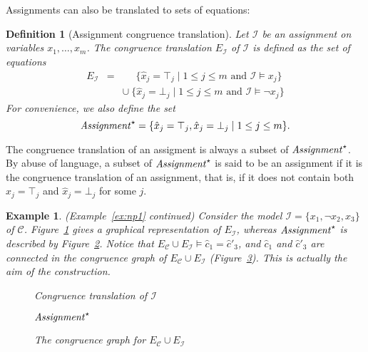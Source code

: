 \documentclass{easychair}
\newtheorem{example}{Example}
\newtheorem{definition}{Definition}
\begin{document}
Assignments can also be translated to sets of equations:
\begin{definition}[Assignment congruence translation]
Let $\mathcal{I}$ be an assignment on variables $x_1,\ldots,x_m$.
The congruence translation $E_{\mathcal{I}}$ of $\mathcal{I}$ is defined as the set of equations
\begin{eqnarray*}
  E_{\mathcal{I}} & = & \phantom{\cup}\ \{ \hat{x}_j = \top_j \mid 1 \leq j \leq m \text{ and } \mathcal{I} \models x_j \} \\
               &   & \cup\ \{ \hat{x}_j = \bot_j \mid 1 \leq j \leq m \text{ and } \mathcal{I} \models \neg x_j \}
\end{eqnarray*}
For convenience, we also define the set
\begin{equation*}
  {\it Assignment}^\star = \{ \hat{x}_j = \top_j, \hat{x}_j = \bot_j \mid 1 \leq j \leq m\}.
\end{equation*}
\end{definition}
\noindent
The congruence translation of an assigment is always a subset of
${\it Assignment}^\star$.  By abuse of language, a subset of ${\it Assignment}^\star$ is
said to be an assignment if it is the congruence translation of an assignment,
that is, if it does not contain both $\hat{x}_j = \top_j$ and $\hat{x}_j =
\bot_j$ for some $j$.

\begin{example}\label{ex:np2} (Example~\ref{ex:np1} continued)  
Consider the model $\mathcal{I} = \{x_1, \neg x_2, x_3\}$ of $\mathcal{C}$.
Figure~\ref{fig:npassignment} gives a graphical representation of
$E_{\mathcal{I}}$, whereas ${\it Assignment}^\star$ is described by
Figure~\ref{fig:npassignmentstar}.  Notice that
$E_{\mathcal{C}} \cup E_{\mathcal{I}} \models \hat{c}_1 = \hat{c}'_3$,
and $\hat{c}_1$ and $\hat{c}'_3$ are connected in the congruence graph
of $E_{\mathcal{C}} \cup E_{\mathcal{I}}$ (Figure~\ref{fig:npmodel}).
This is actually the aim of the construction.

\begin{figure}[ht]

\caption{Congruence translation of $\mathcal{I}$}
\label{fig:npassignment}
\end{figure}

\begin{figure}[ht]

\caption{${\it Assignment}^\star$}
\label{fig:npassignmentstar}
\end{figure}
\begin{figure}[ht]

\caption{The congruence graph for $E_{\mathcal{C}} \cup E_{\mathcal{I}}$}
\label{fig:npmodel}
\end{figure}
\end{example}
\end{document}
